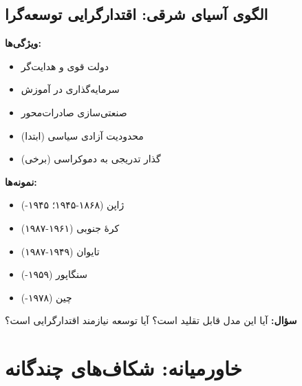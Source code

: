 \subsection*{الگوی آسیای شرقی: اقتدارگرایی توسعه‌گرا}

\begin{tcolorbox}[
    enhanced,
    colback=goldaccent!10,
    colframe=goldaccent,
    boxrule=1.5pt,
    arc=5pt,
    fonttitle=\bfseries,
    title={\rl{🟡 الگوی توسعهٔ آسیای شرقی}}
]

\textbf{ویژگی‌ها:}
\begin{itemize}
    \item دولت قوی و هدایت‌گر
    \item سرمایه‌گذاری در آموزش
    \item صنعتی‌سازی صادرات‌محور
    \item محدودیت آزادی سیاسی (ابتدا)
    \item گذار تدریجی به دموکراسی (برخی)
\end{itemize}



\textbf{نمونه‌ها:}
\begin{itemize}
    \item ژاپن (۱۸۶۸-۱۹۴۵؛ ۱۹۴۵-)
    \item کرهٔ جنوبی (۱۹۶۱-۱۹۸۷)
    \item تایوان (۱۹۴۹-۱۹۸۷)
    \item سنگاپور (۱۹۵۹-)
    \item چین (۱۹۷۸-)
\end{itemize}


\textbf{سؤال:} آیا این مدل قابل تقلید است؟ آیا توسعه نیازمند اقتدارگرایی است؟
\end{tcolorbox}

\section*{خاورمیانه: شکاف‌های چندگانه}

